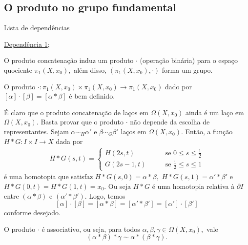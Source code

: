 \subsection{O produto no grupo fundamental} %
\label{produto-bem-definido-prop}
\begin{titlemize}{Lista de dependências}
	\item \hyperref[Produto-grupo-fundamental-def]{Dependência 1};\\ %
\end{titlemize}
O produto concatenação induz um produto $\cdot$ (operação binária) para o espaço quociente $\pi_1(X,x_0),$ além disso, $(\pi_1(X,x_0),\cdot)$ forma um grupo.

\begin{lemma}%
    O produto $\cdot:\pi_1(X,x_0)\times\pi_1(X,x_0)\rightarrow \pi_1(X,x_0)$ dado por $[\alpha]\cdot[\beta]=[\alpha*\beta]$ é bem definido.
\end{lemma}

\begin{dem}
    É claro que o produto concatenação de laços em $\Omega(X,x_0)$ ainda é um laço em $\Omega(X,x_0).$ Basta provar que o produto $\cdot$ não depende da escolha de representantes. Sejam $\alpha\sim_H \alpha'$ e $\beta\sim_G\beta'$ laços em $\Omega(X,x_0)$. Então, a função $H*G:I\times I\rightarrow X$ dada por 
    \begin{align*}
        H*G(s,t)=\begin{cases}
            H(2s,t)\;\;\;&\;\;\;\mbox{ se }0\le s\le \frac{1}{2}\\
            G(2s-1,t)\;\;\;&\;\;\;\mbox{ se }\frac{1}{2}\le s\le1
        \end{cases}
    \end{align*}
    é uma homotopia que satisfaz $H*G(s,0)=\alpha*\beta,$ $H*G(s,1)=\alpha'*\beta'$ e $H*G(0,t)=H*G(1,t)=x_0.$ Ou seja $H*G$ é uma homotopia relativa à $\partial I$ entre $(\alpha*\beta)$ e $(\alpha'*\beta').$ Logo, temos  
    $$[\alpha]\cdot[\beta]=[\alpha*\beta]=[\alpha'*\beta']=[\alpha']\cdot [\beta']$$
    conforme desejado.
\end{dem}

\begin{lemma}
    O produto $\cdot$ é associativo, ou seja, para todos $\alpha,\beta,\gamma\in\Omega(X,x_0),$ vale
    \[(\alpha*\beta)*\gamma\sim \alpha*(\beta*\gamma).\]
\end{lemma}

